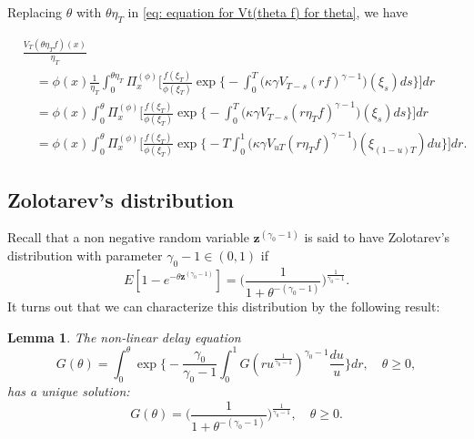 \documentclass[12pt, a4paper]{amsart}
\newtheorem{lem}[thm]{Lemma}
\theoremstyle{definition}
\numberwithin{equation}{section}
\begin{document}
	Replacing $\theta$ with $\theta \eta_T$ in \eqref{eq: equation for Vt(theta f) for theta}, we have

\[\label{eq: equation for normalized V_T}\begin{split}
	&\frac{V_T(\theta \eta_T f)(x)}{\eta_T}
	\\&\quad= \phi(x) \frac{1}{\eta_T}\int_0^{\theta \eta_T} \Pi_x^{(\phi)} \Big[ \frac { f(\xi_T) } { \phi(\xi_T) } \exp\Big\{-\int_0^T \big(\kappa\gamma V_{T-s}(r f)^{\gamma-1}\big)(\xi_s) ds\Big\}\Big] dr
	\\&\quad = \phi(x) \int_0^{\theta} \Pi_x^{(\phi)} \Big[ \frac { f(\xi_T) } { \phi(\xi_T) }  \exp\Big\{-\int_0^T \big(\kappa\gamma V_{T-s}(r \eta_T f)^{\gamma-1}\big)(\xi_s) ds\Big\}\Big] dr
	\\&\quad = \phi(x)\int_0^{\theta} \Pi_x^{(\phi)} \Big[\frac{f(\xi_T)}{\phi(\xi_T)} \exp\Big\{-T\int_0^1 \big(\kappa\gamma V_{uT}(r \eta_T f)^{\gamma-1}\big)(\xi_{(1-u)T}) du\Big\}\Big] dr.
\end{split}\]

\subsection{Zolotarev's distribution}
\label{sec: Characterizing the Zolotarev's distribution using an non-linear delay equation}

	Recall that a non negative random variable $\mathbf z^{(\gamma_0 - 1)}$ is said to have Zolotarev's distribution with parameter $\gamma_0 - 1 \in (0,1)$ if
\[
	E[1-e^{-\theta\mathbf z^{(\gamma_0 - 1)}}]
	=\Big( \frac{1}{1+\theta^{-(\gamma_0 - 1)}} \Big)^{\frac{1}{\gamma_0 - 1}}.
\]
	It turns out that we can characterize this distribution by the following result:

\begin{lem}
\label{lem: characterize the general Mittag-Leffler distribution}
	The non-linear delay equation
\[\label{eq: equation for the distribution}
	G( \theta)
	= \int_0^\theta \exp\Big\{ - \frac{\gamma_0} {\gamma_0 - 1} \int_0^1 G(ru^{\frac{1}{\gamma_0 - 1} })^{\gamma_0 - 1}\frac{du}{u} \Big\} dr,
	\quad \theta \geq 0,
\]
	has a unique solution:
\[\label{eq: solution for the equation}
	G(\theta)
	= \Big(\frac{1}{1+\theta^{-(\gamma_0 - 1)}}\Big)^{\frac{1}{\gamma_0 - 1}},
	\quad \theta \geq 0.
\]
\end{lem}
\end{document}
